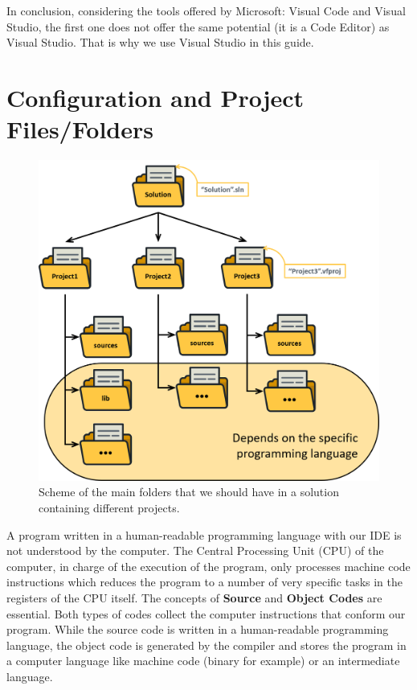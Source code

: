 In conclusion, considering the tools offered by Microsoft: Visual Code and Visual Studio, the first one does not offer the same potential (it is a Code Editor) as Visual Studio. That is why we use Visual Studio in this guide. 


\section{Configuration and Project Files/Folders}

\begin{figure}[h]
    \centering
    \includegraphics[width= \textwidth]{Figures/FolderScheme}
    \caption{Scheme of the main folders that we should have in a solution containing different projects.}
    \label{fig:FolderScheme}
\end{figure}

A program written in a human-readable programming language with our IDE is not understood by the computer. The Central Processing Unit (CPU) of the computer, in charge of the execution of the program, only processes machine code instructions which reduces the program to a number of very specific tasks in the registers of the CPU itself. The concepts of \textbf{Source} and \textbf{Object Codes} are essential. Both types of codes collect the computer instructions that conform our program. While the source code is written in a human-readable programming language, the object code is generated by the compiler and stores the program in a computer language like machine code (binary for example) or an intermediate language.

